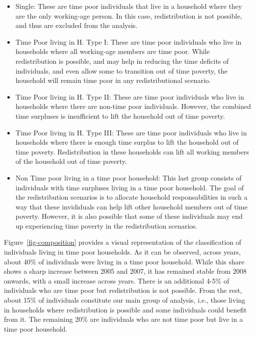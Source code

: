 \documentclass[
  11pt,
]{article}
\providecommand{\tightlist}{%
  \setlength{\itemsep}{0pt}\setlength{\parskip}{0pt}}\usepackage{longtable,booktabs,array}
\begin{document}
\begin{itemize}
\tightlist
\item
  Single: These are time poor individuals that live in a household where
  they are the only working-age person. In this case, redistribution is
  not possible, and thus are excluded from the analysis.
\item
  Time Poor living in H. Type I: These are time poor individuals who
  live in households where all working-age members are time poor. While
  redistribution is possible, and may help in reducing the time deficits
  of individuals, and even allow some to transition out of time poverty,
  the household will remain time poor in any redistributional scenario.
\item
  Time Poor living in H. Type II: These are time poor individuals who
  live in households where there are non-time poor individuals. However,
  the combined time surpluses is insufficient to lift the household out
  of time poverty.
\item
  Time Poor living in H. Type III: These are time poor individuals who
  live in households where there is enough time surplus to lift the
  household out of time poverty. Redistribution in these households can
  lift all working members of the household out of time poverty.
\item
  Non Time poor living in a time poor household: This last group
  consists of individuals with time surpluses living in a time poor
  household. The goal of the redistribution scenarios is to allocate
  household responsabilities in such a way that these invididuals can
  help lift other household members out of time poverty. However, it is
  also possible that some of these individuals may end up experiencing
  time poverty in the redistribution scenarios.
\end{itemize}

Figure~\ref{fig-composition} provides a visual representation of the
classification of individuals living in time poor households. As it can
be observed, across years, about 40\% of individuals were living in a
time poor household. While this share shows a sharp increase between
2005 and 2007, it has remained stable from 2008 onwards, with a small
increase across years. There is an additional 4-5\% of individuals who
are time poor but redistribution is not possible. From the rest, about
15\% of individuals constitute our main group of analysis, i.e., those
living in households where redistribution is possible and some
individuals could benefit from it. The remaining 20\% are individuals
who are not time poor but live in a time poor household.
\end{document}
